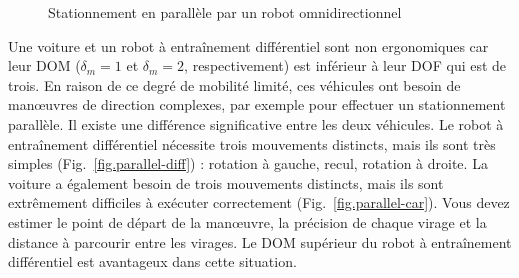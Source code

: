 \begin{figure}
\begin{center}
\end{center}
\caption{Stationnement en parallèle par un robot omnidirectionnel}\label{fig.parallel-omni}
\end{figure}

Une voiture et un robot à entraînement différentiel sont non ergonomiques car leur DOM ($\delta_m=1$ et $\delta_m=2$, respectivement) est inférieur à leur DOF qui est de trois. En raison de ce degré de mobilité limité, ces véhicules ont besoin de manœuvres de direction complexes, par exemple pour effectuer un stationnement parallèle. Il existe une différence significative entre les deux véhicules. Le robot à entraînement différentiel nécessite trois mouvements distincts, mais ils sont très simples (Fig.~\ref{fig.parallel-diff}) : rotation à gauche, recul, rotation à droite. La voiture a également besoin de trois mouvements distincts, mais ils sont extrêmement difficiles à exécuter correctement (Fig.~\ref{fig.parallel-car}). Vous devez estimer le point de départ de la manœuvre, la précision de chaque virage et la distance à parcourir entre les virages. Le DOM supérieur du robot à entraînement différentiel est avantageux dans cette situation.


